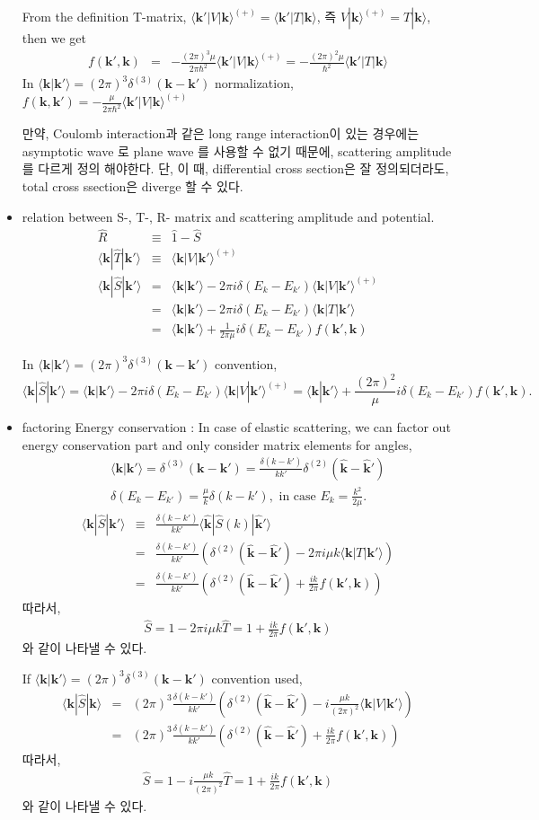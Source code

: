 \documentclass[10pt]{article}
\def\bm{\boldsymbol}
\newcommand{\bea}{\begin{eqnarray}}
\newcommand{\eea}{\end{eqnarray}}
\newcommand{\no}{\nonumber \\}
\def\vk{{\bm k}}
\def\la{\langle}
\def\ra{\rangle}
\begin{document}
\begin{itemize}
From the definition T-matrix, 
$\la \vk'|V|\vk\ra^{(+)}=\la \vk' |T|\vk\ra $,
즉 $V|\vk\ra^{(+)}=T|\vk\ra$, 
then we get
\bea
f(\vk',\vk) &=&-\frac{(2\pi)^3\mu}{2\pi\hbar^2}\la\vk'|V|\vk\ra^{(+)}
            =-\frac{(2\pi)^2\mu}{\hbar^2}\la\vk'|T|\vk\ra
\eea
In  $\la \vk|\vk'\ra=(2\pi)^3\delta^{(3)}(\vk-\vk')$
normalization, $f(\vk,\vk')=-\frac{\mu}{2\pi\hbar^2}\la \vk'|V|\vk\ra^{(+)}$

만약, Coulomb interaction과 같은 long range interaction이 있는 경우에는 
asymptotic wave 로 plane wave 를 사용할 수 없기 때문에,
scattering amplitude를 다르게 정의 해야한다. 단, 이 때, differential cross section은 잘 정의되더라도, total cross ssection은 diverge 할 수 있다.


\item relation between S-, T-, R- matrix and scattering amplitude
and potential.
\bea
\hat{R}& \equiv& \hat{1}-\hat{S} \no
\la \vk|\hat{T}|\vk'\ra &\equiv& \la \vk|V|\vk'\ra^{(+)} \no
\la \vk|\hat{S}|\vk'\ra
&=&\la \vk|\vk'\ra-2\pi i\delta(E_k-E_{k'})\la \vk|V|\vk'\ra^{(+)}
\no
&=&\la \vk|\vk'\ra-2\pi i\delta(E_k-E_{k'})\la \vk|T|\vk'\ra \no
&=&\la \vk|\vk'\ra
   +\frac{1}{2\pi\mu} i\delta(E_k-E_{k'}) f(\vk',\vk)
\eea

In $\la \vk|\vk'\ra=(2\pi)^3\delta^{(3)}(\vk-\vk')$
convention,
$$\la \vk|\hat{S}|\vk'\ra
=\la \vk|\vk'\ra-2\pi i\delta(E_k-E_{k'})\la \vk|V|\vk'\ra^{(+)}
=\la \vk|\vk'\ra+\frac{(2\pi)^2}{\mu} i\delta(E_k-E_{k'})
  f(\vk',\vk).$$

\item factoring Energy conservation : In case of elastic scattering,
     we can factor out energy conservation part and only consider 
     matrix elements for angles,
\bea
& &\la \vk|\vk'\ra=\delta^{(3)}(\vk-\vk')
  =\frac{\delta(k-k')}{k k'}\delta^{(2)}(\hat{\vk}-\hat{\vk}')\no
& &\delta(E_k-E_{k'})=\frac{\mu}{k}\delta(k-k'),
  \mbox{ in case $E_k=\frac{k^2}{2\mu}$.} 
\eea
\bea
\la \vk|\hat{S}|\vk'\ra
&\equiv&  \frac{\delta(k-k')}{k k'}\la\hat{\vk}|\hat{S}(k)|\hat{\vk}'\ra \no
&=&\frac{\delta(k-k')}{k k'}\left(\delta^{(2)}(\hat{\vk}-\hat{\vk}')
   -2\pi i \mu k \la \vk| T|\vk'\ra \right) \no
&=&\frac{\delta(k-k')}{k k'}\left(\delta^{(2)}(\hat{\vk}-\hat{\vk}')
   +\frac{i k}{2\pi}  f(\vk',\vk)\right) 
\eea
따라서,
\bea
\hat{S}=1-2\pi i \mu k \hat{T}=1+\frac{ik}{2\pi}f(\vk',\vk)
\eea
와 같이 나타낼 수 있다.

If $\la \vk|\vk'\ra=(2\pi)^3\delta^{(3)}(\vk-\vk')$
convention used,
\bea
\la \vk|\hat{S}|\vk\ra
&=&(2\pi)^3\frac{\delta(k-k')}{k k'}\left(\delta^{(2)}(\hat{\vk}-\hat{\vk}')
   -i \frac{\mu k}{(2\pi)^2}  \la \vk| V|\vk'\ra \right) \no
&=&(2\pi)^3\frac{\delta(k-k')}{k k'}
    \left(\delta^{(2)}(\hat{\vk}-\hat{\vk}')
   +\frac{i k}{2\pi}  f(\vk',\vk)\right)  
\eea
따라서,
\bea
\hat{S}=1- i \frac{\mu k}{(2\pi)^2} \hat{T}
  =1+\frac{ik}{2\pi}f(\vk',\vk)
\eea
와 같이 나타낼 수 있다.
\end{itemize}
\end{document}
